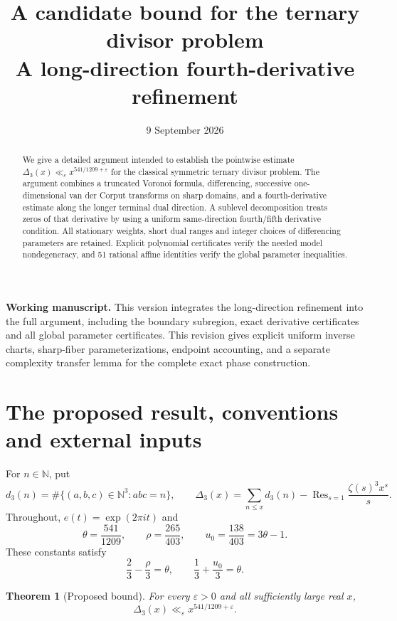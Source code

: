 \documentclass[11pt,a4paper]{article}
\title{A candidate bound for the ternary divisor problem\\
\large A long-direction fourth-derivative refinement}
\author{}
\date{9 September 2026}
\numberwithin{equation}{section}
\newtheorem{theorem}{Theorem}[section]
\theoremstyle{remark}
\newcommand{\N}{\mathbb N}
\newcommand{\eps}{\varepsilon}
\DeclareMathOperator*{\Res}{Res}
\begin{document}
\maketitle
\begin{abstract}
We give a detailed argument intended to establish the pointwise estimate
$\Delta_3(x)\ll_\eps x^{541/1209+\eps}$ for the classical symmetric ternary
divisor problem. The argument combines a truncated Voronoi formula,
differencing, successive one-dimensional van der Corput transforms on sharp
domains, and a fourth-derivative estimate along the longer terminal dual
direction. A sublevel decomposition treats zeros of that derivative by
using a uniform same-direction fourth/fifth derivative condition.
All stationary weights,
short dual ranges and integer choices of differencing parameters are retained.
Explicit polynomial certificates verify the needed model nondegeneracy, and
51 rational affine identities verify the global parameter inequalities.
\end{abstract}

\noindent\textbf{Working manuscript.}
This version integrates the long-direction refinement into the full argument,
including the boundary subregion, exact derivative certificates and all global
parameter certificates. This revision gives explicit uniform inverse charts,
sharp-fiber parameterizations, endpoint accounting, and a separate complexity
transfer lemma for the complete exact phase construction.

\tableofcontents

\section{The proposed result, conventions and external inputs}
\label{sec:inputs}
For $n\in\N$, put
\[
 d_3(n)=\#\{(a,b,c)\in\N^3:abc=n\},\qquad
 \Delta_3(x)=\sum_{n\le x}d_3(n)
   -\Res_{s=1}\frac{\zeta(s)^3x^s}{s}.
\]
Throughout, $e(t)=\exp(2\pi i t)$ and
\begin{equation}\label{eq:parameters}
 \theta=\frac{541}{1209},\qquad
 \rho=\frac{265}{403},\qquad
 u_0=\frac{138}{403}=3\theta-1.
\end{equation}
These constants satisfy
\begin{equation}\label{eq:endpoint-identities}
 \frac23-\frac\rho3=\theta,
 \qquad \frac13+\frac{u_0}{3}=\theta.
\end{equation}

\begin{theorem}[Proposed bound]\label{thm:main}
For every $\eps>0$ and all sufficiently large real $x$,
\[
 \Delta_3(x)\ll_\eps x^{541/1209+\eps}.
\]
\end{theorem}
\end{document}
